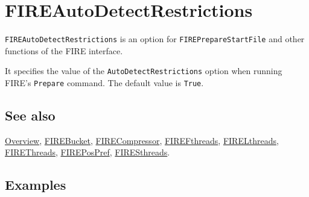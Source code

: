 \documentclass[../FeynHelpersManual.tex]{subfiles}
\begin{document}
\hypertarget{fireautodetectrestrictions}{
\section{FIREAutoDetectRestrictions}\label{fireautodetectrestrictions}}

\texttt{FIREAutoDetectRestrictions} is an option for
\texttt{FIREPrepareStartFile} and other functions of the FIRE interface.

It specifies the value of the \texttt{AutoDetectRestrictions} option
when running FIRE's \texttt{Prepare} command. The default value is
\texttt{True}.

\subsection{See also}

\hyperlink{toc}{Overview}, \hyperlink{firebucket}{FIREBucket},
\hyperlink{firecompressor}{FIRECompressor},
\hyperlink{firefthreads}{FIREFthreads},
\hyperlink{firelthreads}{FIRELthreads},
\hyperlink{firethreads}{FIREThreads},
\hyperlink{firepospref}{FIREPosPref},
\hyperlink{firesthreads}{FIRESthreads}.

\subsection{Examples}
\end{document}
